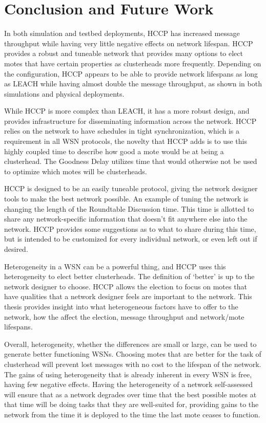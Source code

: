\chapter{Conclusion and Future Work}
\label{ch:conclusion}

In both simulation and testbed deployments, HCCP has increased message throughput while
having very little negative effects on network lifespan. HCCP provides 
a robust and tuneable network that provides many options to elect motes
that have certain properties as clusterheads more frequently. 
Depending on the configuration, HCCP appears to be able to provide network lifespans 
as long as LEACH while having almost double the message throughput, as shown in both 
simulations and physical deployments.

While HCCP is more complex than LEACH, it has a more robust design, and provides
infrastructure for disseminating information across the network. HCCP relies on 
the network to have schedules in tight synchronization, which is a
requirement in all WSN protocols, the novelty that HCCP adds is to 
use this highly coupled time to describe how good a
mote would be at being a clusterhead. The Goodness Delay
utilizes time that would otherwise not be used to optimize 
which motes will be clusterheads. 

HCCP is designed to be an easily tuneable protocol, giving 
the network designer tools to make the best network possible. 
An example of tuning the network is 
changing the length of the Roundtable Discussion time. This time
is allotted to share any network-specific information that 
doesn't fit anywhere else into the network. HCCP provides some suggestions
as to what to share during this time, but is intended to be customized 
for every individual network, or even left out if desired.

Heterogeneity in a WSN can be a powerful thing, and HCCP uses this
heterogeneity to elect better clusterheads. The definition of `better' is
up to the network designer to choose. HCCP allows the election to focus 
on motes that have qualities that a network designer feels are important 
to the network. This thesis provides insight into what heterogeneous 
factors have to offer to the network, how the affect the election, message
throughput and network/mote lifespans.

Overall, heterogeneity, whether the differences are small  or large, can be used 
to generate better functioning WSNs. Choosing motes that are better for the task of clusterhead 
will prevent lost messages with no cost to the lifespan of the network. The gains of 
using heterogeneity that is already inherent in every WSN is free, having few negative 
effects. Having the heterogeneity of a network self-assessed will ensure that 
as a network degrades over time that the best possible motes at that time will
be doing tasks that they are well-suited for, providing gains to the network from the time
it is deployed to the time the last mote ceases to function.

